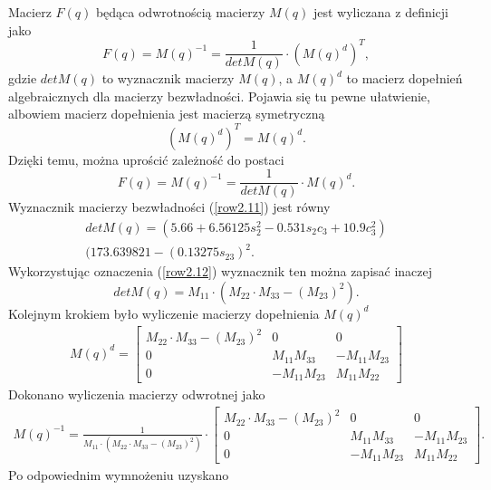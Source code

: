 \documentclass[eng,printmode]{mgr}
\begin{document}
Macierz $F(q)$ będąca odwrotnością macierzy $M(q)$ jest wyliczana z definicji jako
\begin{equation}\label{row2.13}
F(q)=M(q)^{-1}=\frac{1}{detM(q)} \cdot (M(q)^d)^T,
\end{equation}
gdzie $detM(q)$ to wyznacznik macierzy $M(q)$, a $M(q)^d$ to macierz dopełnień algebraicznych dla macierzy bezwładności. Pojawia się tu pewne ułatwienie, albowiem macierz dopełnienia jest macierzą symetryczną
\begin{equation}
(M(q)^d)^T = M(q)^d.
\end{equation}
Dzięki temu, można uprościć zależność do postaci
\begin{equation}
F(q)=M(q)^{-1}=\frac{1}{detM(q)} \cdot M(q)^d.
\end{equation}
Wyznacznik macierzy bezwładności (\ref{row2.11}) jest równy
\begin{eqnarray}
detM(q)= (5.66+6.56125s_2^2 - 0.531s_2c_3 + 10.9c_3^2)\nonumber \\
(173.639821 - (0.13275s_{23})^2.
\end{eqnarray}
Wykorzystując oznaczenia (\ref{row2.12}) wyznacznik ten można zapisać inaczej
\begin{equation}\label{row2.17}
detM(q)= M_{11} \cdot (M_{22} \cdot M_{33} - (M_{23})^2).
\end{equation}
Kolejnym krokiem było wyliczenie macierzy dopełnienia $M(q)^d$ 
\begin{eqnarray}\label{row2.18}
M(q)^d=\left[
        \begin{array}{ccc}
         M_{22} \cdot M_{33} - (M_{23})^2 & 0 & 0\\ 
         0 & M_{11}M_{33} & -M_{11}M_{23}\\
         0 & -M_{11}M_{23} & M_{11}M_{22}
         \end{array}
      \right] 
\end{eqnarray}
Dokonano wyliczenia macierzy odwrotnej jako
\begin{eqnarray}
M(q)^{-1}= \frac{1}{M_{11} \cdot (M_{22} \cdot M_{33} - (M_{23})^2)} \cdot \left[
        \begin{array}{ccc}
         M_{22} \cdot M_{33} - (M_{23})^2 & 0 & 0\\ 
         0 & M_{11}M_{33} & -M_{11}M_{23}\\
         0 & -M_{11}M_{23} & M_{11}M_{22}
         \end{array}
      \right].\nonumber
      \end{eqnarray}
      Po odpowiednim wymnożeniu uzyskano
\end{document}
